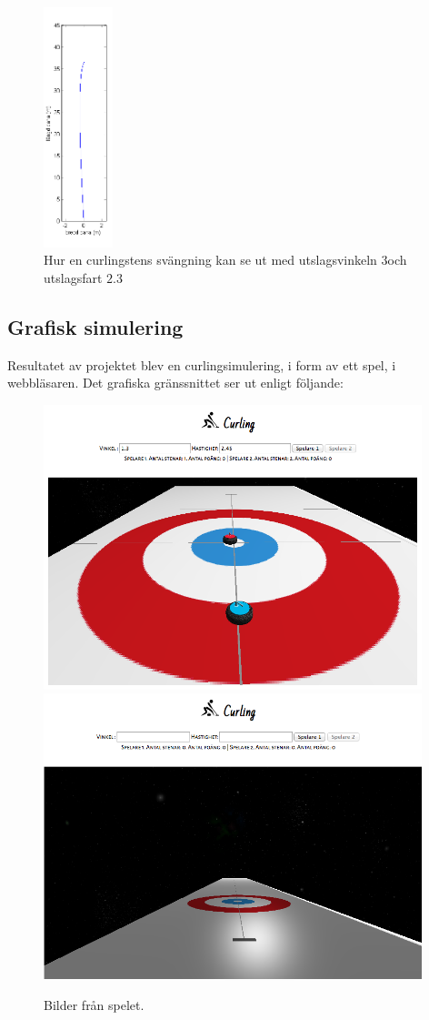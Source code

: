 \documentclass[11pt]{article} %
\begin{document}
\begin{figure}[ht!]
\centering
\includegraphics[width=20mm]{curvMatlab.png}
\caption{Hur en curlingstens svängning kan se ut med utslagsvinkeln $3$\textdegree och utslagsfart $2.3$}
\label{fig:kurvaMatlab}
\label{overflow}
\end{figure}

\pagebreak

\subsection{Grafisk simulering}
Resultatet av projektet blev en curlingsimulering, i form av ett spel, i webbläsaren. Det grafiska gränssnittet ser ut enligt följande: 

\begin{figure}[ht!]
\centering
\includegraphics[width=110mm]{game4.png}
\includegraphics[width=110mm]{game2.png}
\caption{Bilder från spelet.}
\label{fig:spell}
\label{overflow}
\end{figure}
\end{document}
